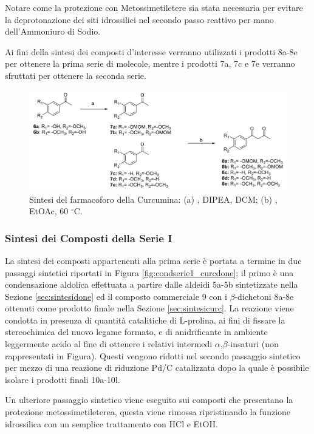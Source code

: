 \documentclass[a4paper, 12pt]{article}
\begin{document}
Notare come la protezione con Metossimetiletere sia stata necessaria per evitare la deprotonazione dei siti idrossilici nel secondo passo reattivo per mano dell'Ammoniuro di Sodio.

Ai fini della sintesi dei composti d'interesse verranno utilizzati i prodotti 8a-8e per ottenere la prima serie di molecole, mentre i prodotti 7a, 7c e 7e  verranno sfruttati per ottenere la seconda serie.

\begin{figure}[H]
	\centering
	\includegraphics[width=\linewidth]{immagini/farmacurc_curcdone.png}
	\caption{Sintesi del farmacoforo della Curcumina: (a) , DIPEA, DCM; (b)  , EtOAc, 60 $^\circ$C.}
	\label{fig:farmacurc_curcdone}
\end{figure}



\subsubsection{Sintesi dei Composti della Serie I}
\label{sec:condserie1}
La sintesi dei composti appartenenti alla prima serie è portata a termine in due passaggi sintetici riportati in Figura \ref{fig:condserie1_curcdone}; il primo è una condensazione aldolica effettuata a partire dalle aldeidi 5a-5b sintetizzate nella Sezione \ref{sec:sintesidone} ed il composto commerciale 9 con i \(\beta\)-dichetoni 8a-8e ottenuti come prodotto finale nella Sezione \ref{sec:sintesicurc}. La reazione viene condotta in presenza di quantità catalitiche di L-prolina, ai fini di fissare la stereochimica del nuovo legame formato, e di anidrificante  in ambiente leggermente acido al fine di ottenere i relativi intermedi \(\alpha\),\(\beta\)-insaturi (non rappresentati in Figura). Questi	vengono ridotti nel secondo passaggio sintetico per mezzo di una reazione di riduzione Pd/C catalizzata dopo la quale è possibile isolare i prodotti finali 10a-10l.

Un ulteriore passaggio sintetico viene eseguito sui composti che presentano la protezione metossimetileterea, questa viene rimossa ripristinando la funzione idrossilica con un semplice trattamento con HCl e EtOH.
\end{document}
